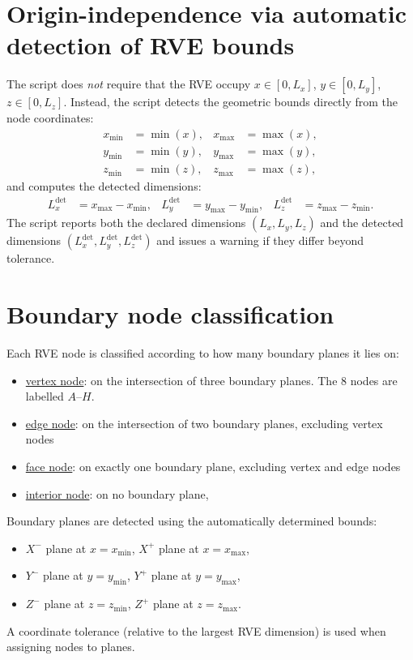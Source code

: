 \documentclass[11pt]{article}
\newcommand{\ul} {\underline}
\begin{document}
\section{Origin-independence via automatic detection of RVE bounds}
The script does \emph{not} require that the RVE occupy 
$x\in[0,L_x]$, $y\in[0,L_y]$, $z\in[0,L_z]$.
Instead, the script detects the geometric bounds directly from the node coordinates:
\begin{align}
x_{\min} &= \min(x), & x_{\max} &= \max(x), \\
y_{\min} &= \min(y), & y_{\max} &= \max(y), \\
z_{\min} &= \min(z), & z_{\max} &= \max(z),
\end{align}
and computes the detected dimensions:
\begin{align}
L_x^{\mathrm{det}} &= x_{\max}-x_{\min}, &
L_y^{\mathrm{det}} &= y_{\max}-y_{\min}, &
L_z^{\mathrm{det}} &= z_{\max}-z_{\min}.
\end{align}
The script reports both the declared dimensions $(L_x,L_y,L_z)$ and the detected dimensions
$(L_x^{\mathrm{det}},L_y^{\mathrm{det}},L_z^{\mathrm{det}})$ and issues 
a warning if they differ beyond tolerance.


\section{Boundary node classification}

Each RVE node is classified according to how many boundary planes it lies on:
\begin{itemize}
\item \ul{vertex node}: on the intersection of three boundary planes. 
The 8 nodes are labelled $A$--$H$.
\item \ul{edge node}: on the intersection of two boundary planes, excluding vertex nodes
\item \ul{face node}: on exactly one boundary plane, excluding vertex and edge nodes
\item \ul{interior node}: on no boundary plane,
\end{itemize}
Boundary planes are detected using the automatically determined bounds:
\begin{itemize}
\item $X^{-}$ plane at $x=x_{\min}$, \quad $X^{+}$ plane at $x=x_{\max}$,
\item $Y^{-}$ plane at $y=y_{\min}$, \quad $Y^{+}$ plane at $y=y_{\max}$,
\item $Z^{-}$ plane at $z=z_{\min}$, \quad $Z^{+}$ plane at $z=z_{\max}$.
\end{itemize}
A coordinate tolerance (relative to the largest RVE dimension) 
is used when assigning nodes to planes.
\end{document}
